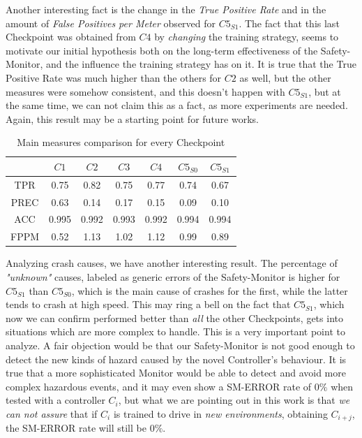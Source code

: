 Another interesting fact is the change in the \textsl{True Positive Rate} and in the amount of \textsl{False Positives per Meter} observed for $C5_{S1}$. The fact that this last Checkpoint was obtained from $C4$ by \textsl{changing} the training strategy, seems to motivate our initial hypothesis both on the long-term effectiveness of the Safety-Monitor, and the influence the training strategy has on it. It is true that the True Positive Rate was much higher than the others for $C2$ as well, but the other measures were somehow consistent, and this doesn't happen with $C5_{S1}$, but at the same time, we can not claim this as a fact, as more experiments are needed. Again, this result may be a starting point for future works.


\begin{table}[h]
	\begin{center}
		\begin{tabular}{ |c|c|c|c|c||c|c| }
			\hline
			& $C1$ & $C2$ & $C3$ & $C4$ & $C5_{S0}$ & $C5_{S1}$ \\
			\hline
			TPR & 0.75 & 0.82 & 0.75 & 0.77 & 0.74 & 0.67 \\
			\hline
			PREC & 0.63 & 0.14 & 0.17 & 0.15 & 0.09 & 0.10\\
			\hline
			ACC & 0.995 & 0.992 & 0.993 & 0.992 & 0.994 & 0.994\\
			\hline
			FPPM & 0.52 & 1.13 & 1.02 & 1.12 & 0.99 & 0.89 \\
			\hline
		\end{tabular}
		
		\caption{Main measures comparison for every Checkpoint}
	\end{center}
\end{table}


Analyzing crash causes, we have another interesting result. The percentage of \textsl{"unknown"} causes, labeled as generic errors of the Safety-Monitor is higher for $C5_{S1}$ than $C5_{S0}$, which is the main cause of crashes for the first, while the latter tends to crash at high speed. This may ring a bell on the fact that $C5_{S1}$, which now we can confirm performed better than \textsl{all} the other Checkpoints, gets into situations which are more complex to handle. This is a very important point to analyze. A fair objection would be that our Safety-Monitor is not good enough to detect the new kinds of hazard caused by the novel Controller's behaviour. It is true that a more sophisticated Monitor would be able to detect and avoid more complex hazardous events, and it may even show a SM-ERROR rate of $0\%$ when tested with a controller $C_{i}$, but what we are pointing out in this work is that \textsl{we can not assure} that if $C_{i}$ is trained to drive in \textsl{new environments}, obtaining $C_{i+j}$, the SM-ERROR rate will still be $0\%$.\newline

